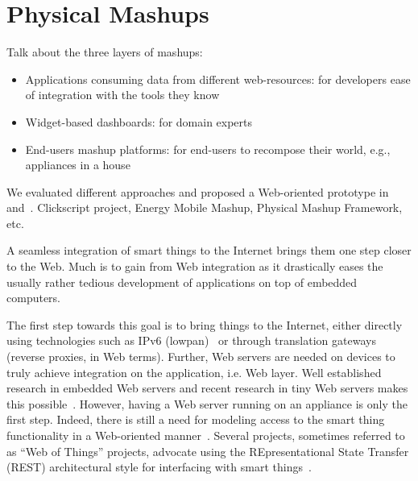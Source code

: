 \chapter{Physical Mashups}
Talk about the three layers of mashups:
\begin{itemize}
 \item Applications consuming data from different web-resources: for developers ease of integration with the tools they know
 \item Widget-based dashboards: for domain experts
 \item End-users mashup platforms: for end-users to recompose their world, e.g., appliances in a house
\end{itemize}

We evaluated different approaches and proposed a Web-oriented prototype in~\cite{kovatsch_embedding_2010} and~\cite{guinard_mashing_2010}.
Clickscript project, Energy Mobile Mashup, Physical Mashup Framework, etc.

A seamless integration of smart things to the Internet brings them one step closer to the Web. Much is to gain from Web integration as it drastically eases the usually rather tedious development of applications on top of embedded computers.

The first step towards this goal is to bring things to the Internet, either directly using technologies such as IPv6 (lowpan)~\cite{yazar_efficient_2009} or through translation gateways~\cite{guinard_architectingmashable_2010} (reverse proxies, in Web terms). Further, Web servers are needed on devices to truly achieve integration on the application, i.e. Web layer. Well established research in embedded Web servers and recent research in tiny Web servers makes this possible~\cite{Duquennoy09}. However, having a Web server running on an appliance is only the first step. Indeed, there is still a need for modeling access to the smart thing functionality in a Web-oriented manner~\cite{kindberg_people_2002}. Several projects, sometimes referred to as ``Web of Things'' projects, advocate using the REpresentational State Transfer (REST) architectural style for interfacing with smart things~\cite{guinard_architectingmashable_2010,drytkiewicz_prest:rest-based_2004,luckenbach_tinyrest_2005}. 


